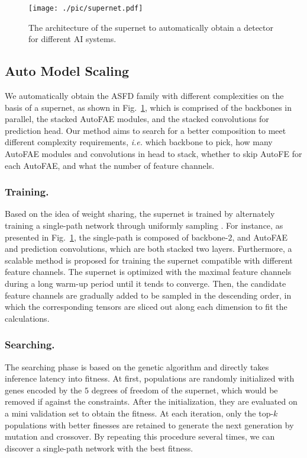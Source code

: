 \documentclass[sigconf]{acmart}
\begin{document}
\begin{figure}[!t]
    \centering
    \texttt{[image: ./pic/supernet.pdf]}
    \caption{The architecture of the supernet to automatically obtain a detector for different AI systems.}
    \label{fig:arch_supernet}
\end{figure}

\subsection{Auto Model Scaling}


We automatically obtain the ASFD family with different complexities on the basis of a supernet, as shown in Fig.~\ref{fig:arch_supernet}, which is comprised of the backbones in parallel, the stacked AutoFAE modules, and the stacked convolutions for prediction head. Our method aims to search for a better composition to meet different complexity requirements, \textit{i.e.} which backbone to pick, how many AutoFAE modules and convolutions in head to stack, whether to skip AutoFE for each AutoFAE, and what the number of feature channels.

\subsubsection{Training.}
Based on the idea of weight sharing, the supernet is trained by alternately training a single-path network through uniformly sampling \cite{guo2019spos,chu2019fairnas}.
For instance, as presented in Fig.~\ref{fig:arch_supernet}, the single-path is composed of backbone-$2$, and AutoFAE and prediction convolutions, which are both stacked two layers. 
Furthermore, a scalable method is proposed for training the supernet compatible with different feature channels. The supernet is optimized with the maximal feature channels during a long warm-up period until it tends to converge. Then, the candidate feature channels are gradually added to be sampled in the descending order, in which the corresponding tensors are sliced out along each dimension to fit the calculations.


\subsubsection{Searching.}
The searching phase is based on the genetic algorithm \cite{guo2019spos,chen2019detnas,chu2019fairnas} and directly takes inference latency into fitness. At first, populations are randomly initialized with genes encoded by the $5$ degrees of freedom of the supernet, which would be removed if against the constraints. After the initialization, they are evaluated on a mini validation set to obtain the fitness. At each iteration, only the top-$k$ populations with better finesses are retained to generate the next generation by mutation and crossover. By repeating this procedure several times, we can discover a single-path network with the best fitness.
\end{document}

